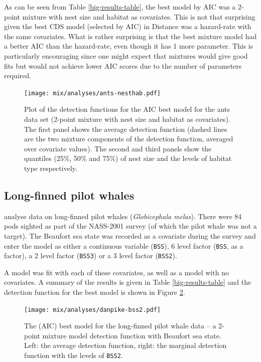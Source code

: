 As can be seen from Table \ref{big-results-table}, the best model by AIC was a 2-point mixture with nest size and habitat as covariates. This is not that surprising given the best CDS model (selected by AIC) in Distance was a hazard-rate with the same covariates. What is rather surprising is that the best mixture model had a better AIC than the hazard-rate, even though it has 1 more parameter. This is particularly encouraging since one might expect that mixtures would give good fits but would not achieve lower AIC scores due to the number of parameters required.

\begin{figure}
\centering
\texttt{[image: mix/analyses/ants-nesthab.pdf]}
\caption{Plot of the detection functions for the AIC best model for the ants data set (2-point mixture with nest size and habitat as covariates). The first panel shows the average detection function (dashed lines are the two mixture components of the detection function, averaged over covariate values). The second and third panels show the quantiles (25\%, 50\% and 75\%) of nest size and the levels of habitat type respectively.}
\label{ants-nesthab}
\end{figure}

\subsection{Long-finned pilot whales}

 analyse data on long-finned pilot whales (\textit{Globicephala melas}). There were 84 pods sighted as part of the NASS-2001 survey (of which the pilot whale was not a target). The Beaufort sea state was recorded as a covariate during the survey and enter the model as either a continuous variable (\texttt{BSS}), 6 level factor (\texttt{BSS}, as a factor), a 2 level factor (\texttt{BSS3}) or a 3 level factor (\texttt{BSS2}).

A model was fit with each of these covariates, as well as a model with no covariates. A summary of the results is given in Table \ref{big-results-table} and the detection function for the best model is shown in Figure \ref{danpike-detfct}.

\begin{figure}
\centering
\texttt{[image: mix/analyses/danpike-bss2.pdf]}
\caption{The (AIC) best model for the long-finned pilot whale data -- a 2-point mixture model detection function with Beaufort sea state. Left: the average detection function, right: the marginal detection function with the levels of \texttt{BSS2}.}
\label{danpike-detfct}
\end{figure}

